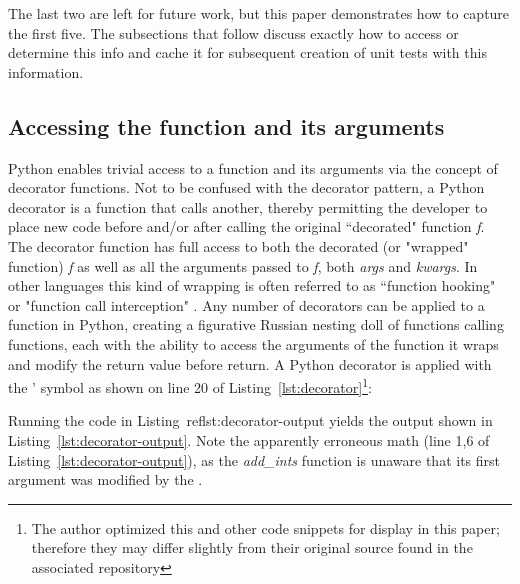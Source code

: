 \documentclass[10pt, conference]{IEEEtran}
\begin{document}
The last two are left for future work, but this paper demonstrates how to capture 
the first five. The subsections that follow discuss exactly how to 
access or determine this info and cache it for subsequent creation of unit tests
with this information.
\subsection{Accessing the function and its arguments}\label{sec:approach-internal-1}

Python enables trivial access to a function and 
its arguments via the concept of decorator functions. Not to be confused with 
the decorator pattern, a Python decorator is a 
function that calls another, thereby permitting the developer to place new code 
before and/or after calling the original “decorated" function \textit{f}.  
The decorator function has full access to both the decorated 
(or "wrapped" function) \textit{f} as well as all the 
arguments passed to \textit{f}, both \textit{args} and \textit{kwargs}.  In other 
languages this kind of wrapping is often referred to as 
“function hooking" or "function call interception" 
 \cite{kang2018function}. Any number of decorators can be applied to a function 
in Python, creating a figurative Russian nesting doll of
functions calling functions, each with the ability to access the 
arguments of the function it wraps and modify the 
return value before return. A Python decorator is applied with the \lq@\rq 
symbol as shown on line 20 of Listing~\ref{lst:decorator}\footnote{The author optimized this and other code snippets for display in 
this paper; therefore they may differ slightly from their original 
source found in the associated repository}:



Running the code in Listing~ref{lst:decorator-output} yields the output shown in 
Listing~\ref{lst:decorator-output}. Note the apparently erroneous math (line 1,6 of 
Listing~\ref{lst:decorator-output}), as the \textit{add\_ints} function is 
unaware that its first argument was modified by the .

\lstset{style=batstyle}


\lstset{style=pythonstyle}
\end{document}
